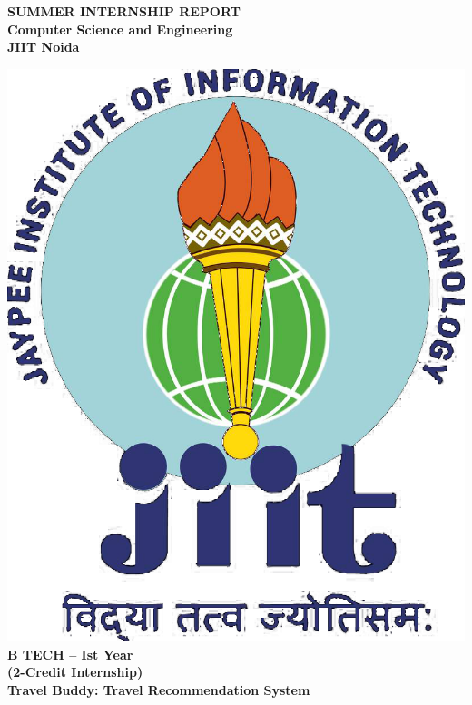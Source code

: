 \documentclass[12pt,a4paper]{report}
\begin{document}
\begin{titlepage}
	\centering
	    
	\Huge
	\textbf{SUMMER INTERNSHIP REPORT} \\
	\Large
	\textbf{Computer Science and Engineering  }\\
  \textbf{JIIT Noida}\\
	\vspace{0.5cm}
	\vspace*{\fill}
	    
	\includegraphics[scale=0.2]{jiit_logo}\\
	    
	\vspace{0.5cm}
	\textbf{B TECH – Ist Year }\\
	\textbf{(2-Credit Internship)}\\
	\textbf{Travel Buddy: Travel Recommendation System}\\
	\vspace{1cm}
	

\end{titlepage}
\end{document}
